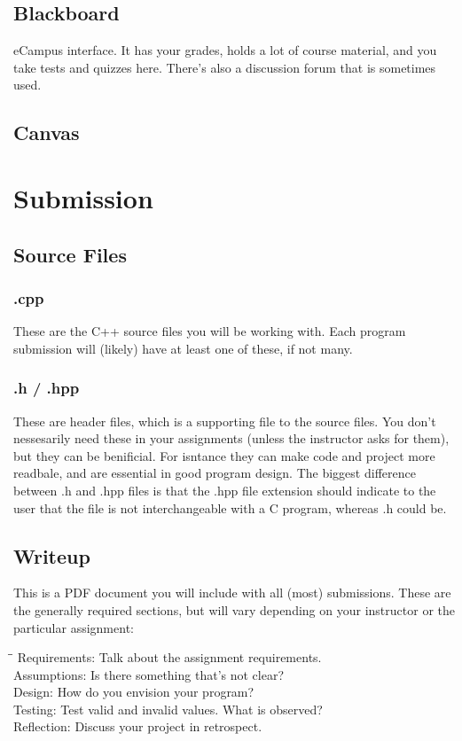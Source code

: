 \documentclass[letterpaper,10pt,titlepage,fleqn]{article}
\begin{document}
\subsection{Blackboard}
eCampus interface. It has your grades, holds a lot of course material, and you take tests and quizzes here. There’s also a discussion forum that is sometimes used.


\subsection{Canvas}





\section{Submission}

\subsection{Source Files}
\subsubsection{.cpp}
These are the C++ source files you will be working with. Each program submission
will (likely) have at least one of these, if not many.

\subsubsection{.h / .hpp}
These are header files, which is a supporting file to the source files. You
don't nessesarily need these in your assignments (unless the instructor asks for
them), but they can be benificial. For isntance they can make code and project
more readbale, and are essential in good program design. The biggest difference
between .h and .hpp files is that the .hpp file extension should indicate to the
user that the file is not interchangeable with a C program, whereas .h could be.


\subsection{Writeup}
This is a PDF document you will include with all (most) submissions.
These are the generally required sections, but will vary depending on your
instructor or the particular assignment:

\begin{tabbing}
\hspace*{2cm}\=\hspace*{3cm}\= \kill
Requirements: 	\>\>Talk about the assignment requirements. \\
Assumptions: 	\>\>Is there something that’s not clear? \\
Design: 		\>\>How do you envision your program? \\
Testing:		\>\>Test valid and invalid values. What is observed? \\
Reflection: 	\>\>Discuss your project in retrospect. \\
\end{tabbing}
\end{document}
